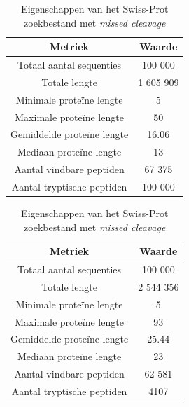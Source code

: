 \documentclass[11pt,dutch,faculty=we,layout=titlefont,underline=false,titleUppercase=true,titleUnderline=true]{ugent2016-report}
\begin{document}
    \begin{table}[!h]
        \begin{minipage}{.5\linewidth}
            \centering
            \begin{tabular}{c c}
                Metriek                    & Waarde    \\
                \hline\hline
                Totaal aantal sequenties   & 100 000   \\
                Totale lengte              & 1 605 909 \\
                Minimale proteïne lengte   & 5         \\
                Maximale proteïne lengte   & 50        \\
                Gemiddelde proteïne lengte & 16.06     \\
                Mediaan proteïne lengte    & 13        \\
                Aantal vindbare peptiden   & 67 375    \\
                Aantal tryptische peptiden & 100 000    \\
                \hline
            \end{tabular}
            \caption{Eigenschappen van \newline het Swiss-Prot zoekbestand \newline zonder \textit{missed cleavage}}
            \label{tab:swiss_geen_missed_cleavage}
        \end{minipage}
        \begin{minipage}{.5\linewidth}
            \centering
            \begin{tabular}{ c c }
                Metriek                    & Waarde    \\
                \hline\hline
                Totaal aantal sequenties   & 100 000   \\
                Totale lengte              & 2 544 356 \\
                Minimale proteïne lengte   & 5         \\
                Maximale proteïne lengte   & 93        \\
                Gemiddelde proteïne lengte & 25.44     \\
                Mediaan proteïne lengte    & 23        \\
                Aantal vindbare peptiden   & 62 581    \\
                Aantal tryptische peptiden & 4107      \\
                \hline
            \end{tabular}
            \caption{Eigenschappen van \newline het Swiss-Prot zoekbestand \newline met \textit{missed cleavage}}
            \label{tab:swiss_missed_cleavage}
        \end{minipage}
    \end{table}
\end{document}
